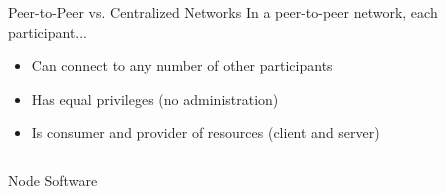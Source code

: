 \documentclass[]{beamer}
\begin{document}
\begin{frame}{Peer-to-Peer vs. Centralized Networks}
	\vspace{1em}
	In a peer-to-peer network, each participant...
	\vspace{0.5em}
		\begin{itemize}
			\item<2-> Can connect to any number of other participants
			\item<3-> Has equal privileges (no administration)
			\item<4-> Is consumer and provider of resources (client and server)
		\end{itemize}
	\begin{columns}[T]
		\begin{column}{0.5\textwidth}
			\vspace{2.5em}
			\begin{tikzpicture}[scale=0.7, every node/.style={scale=0.7}]
				
			\end{tikzpicture}
		\end{column}
		\begin{column}{0.5\textwidth}
			\begin{tikzpicture}[scale=0.7, every node/.style={scale=0.7}]
				
			\end{tikzpicture}
		\end{column}
	\end{columns}
\end{frame}


\begin{frame}{Node Software}
	\centering
	\begin{tikzpicture}[scale=0.7, every node/.style={scale=1}]
		
	\end{tikzpicture}
\end{frame}
\end{document}
